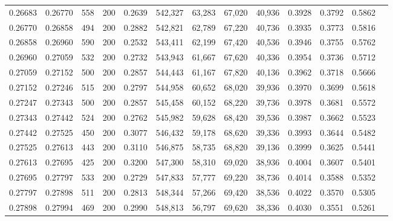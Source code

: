 \begin{tabular}{rrrrrrrrrrrrr}
0.26683 & 0.26770 &    558 & 200 &                                     0.2639 & 542,327 &  63,283 &  67,020 &  40,936 & 0.3928 & 0.3792 & 0.5862 \\
0.26770 & 0.26858 &    494 & 200 &                                     0.2882 & 542,821 &  62,789 &  67,220 &  40,736 & 0.3935 & 0.3773 & 0.5816 \\
0.26858 & 0.26960 &    590 & 200 &                                     0.2532 & 543,411 &  62,199 &  67,420 &  40,536 & 0.3946 & 0.3755 & 0.5762 \\
0.26960 & 0.27059 &    532 & 200 &                                     0.2732 & 543,943 &  61,667 &  67,620 &  40,336 & 0.3954 & 0.3736 & 0.5712 \\
0.27059 & 0.27152 &    500 & 200 &                                     0.2857 & 544,443 &  61,167 &  67,820 &  40,136 & 0.3962 & 0.3718 & 0.5666 \\
0.27152 & 0.27246 &    515 & 200 &                                     0.2797 & 544,958 &  60,652 &  68,020 &  39,936 & 0.3970 & 0.3699 & 0.5618 \\
0.27247 & 0.27343 &    500 & 200 &                                     0.2857 & 545,458 &  60,152 &  68,220 &  39,736 & 0.3978 & 0.3681 & 0.5572 \\
0.27343 & 0.27442 &    524 & 200 &                                     0.2762 & 545,982 &  59,628 &  68,420 &  39,536 & 0.3987 & 0.3662 & 0.5523 \\
0.27442 & 0.27525 &    450 & 200 &                                     0.3077 & 546,432 &  59,178 &  68,620 &  39,336 & 0.3993 & 0.3644 & 0.5482 \\
0.27525 & 0.27613 &    443 & 200 &                                     0.3110 & 546,875 &  58,735 &  68,820 &  39,136 & 0.3999 & 0.3625 & 0.5441 \\
0.27613 & 0.27695 &    425 & 200 &                                     0.3200 & 547,300 &  58,310 &  69,020 &  38,936 & 0.4004 & 0.3607 & 0.5401 \\
0.27695 & 0.27797 &    533 & 200 &                                     0.2729 & 547,833 &  57,777 &  69,220 &  38,736 & 0.4014 & 0.3588 & 0.5352 \\
0.27797 & 0.27898 &    511 & 200 &                                     0.2813 & 548,344 &  57,266 &  69,420 &  38,536 & 0.4022 & 0.3570 & 0.5305 \\
0.27898 & 0.27994 &    469 & 200 &                                     0.2990 & 548,813 &  56,797 &  69,620 &  38,336 & 0.4030 & 0.3551 & 0.5261 \\

\end{tabular}
